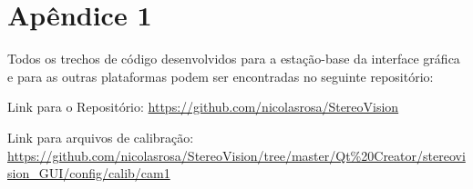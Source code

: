 \chapter{Apêndice 1}
\label{Apendice1}

Todos os trechos de código desenvolvidos para a estação-base da interface gráfica e para as outras plataformas podem ser encontradas no seguinte repositório:

Link para o Repositório: \url{https://github.com/nicolasrosa/StereoVision}

Link para arquivos de calibração: \url{https://github.com/nicolasrosa/StereoVision/tree/master/Qt\%20Creator/stereovision_GUI/config/calib/cam1}

